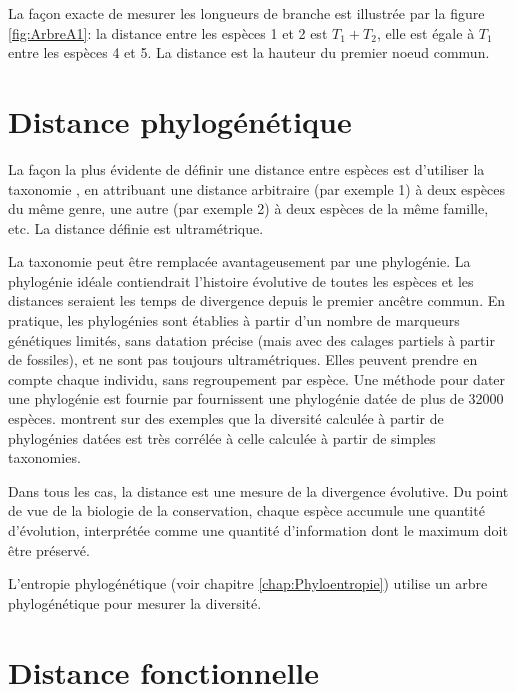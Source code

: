 \documentclass[
  11pt,
  french,
  a4paper,
  extrafontsizes,onecolumn,openright
  ]{memoir}
\begin{document}
\normalsize

La façon exacte de mesurer les longueurs de branche est illustrée par la figure \ref{fig:ArbreA1}: la distance entre les espèces 1 et 2 est \(T_1+T_2\), elle est égale à \(T_1\) entre les espèces 4 et 5.
La distance est la hauteur du premier noeud commun.

\hypertarget{sec:Dphylo}{%
\section{Distance phylogénétique}\label{sec:Dphylo}}

La façon la plus évidente de définir une distance entre espèces est d'utiliser la taxonomie \autocite[Warwick2001]{Clarke2001}, en attribuant une distance arbitraire (par exemple 1) à deux espèces du même genre, une autre (par exemple 2) à deux espèces de la même famille, etc.
La distance définie est ultramétrique.

La taxonomie peut être remplacée avantageusement par une phylogénie.
La phylogénie idéale contiendrait l'histoire évolutive de toutes les espèces et les distances seraient les temps de divergence depuis le premier ancêtre commun.
En pratique, les phylogénies sont établies à partir d'un nombre de marqueurs génétiques limités, sans datation précise (mais avec des calages partiels à partir de fossiles), et ne sont pas toujours ultramétriques.
Elles peuvent prendre en compte chaque individu, sans regroupement par espèce.
Une méthode pour dater une phylogénie est fournie par \textcite{Chave2007}
\textcite{Zanne2014} fournissent une phylogénie datée de plus de 32000 espèces.
\textcite{Ricotta2012a} montrent sur des exemples que la diversité calculée à partir de phylogénies datées est très corrélée à celle calculée à partir de simples taxonomies.

Dans tous les cas, la distance est une mesure de la divergence évolutive.
Du point de vue de la biologie de la conservation, chaque espèce accumule une quantité d'évolution, interprétée comme une quantité d'information \autocite{Crozier1997} dont le maximum doit être préservé.

L'entropie phylogénétique (voir chapitre \ref{chap:Phyloentropie}) utilise un arbre phylogénétique pour mesurer la diversité.

\hypertarget{sec:DFonctionnelle}{%
\section{Distance fonctionnelle}\label{sec:DFonctionnelle}}
\end{document}

